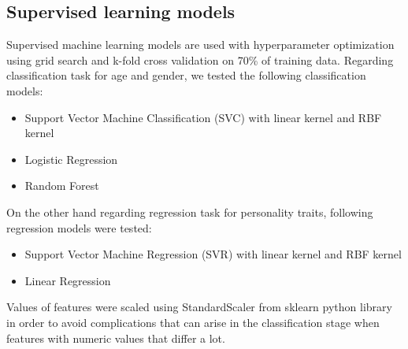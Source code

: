 \documentclass[10pt, a4paper]{article}
\begin{document}
\subsection{Supervised learning models}

Supervised machine learning models are used with hyperparameter optimization using grid search and k-fold cross validation on  70\% of training data. Regarding classification task for age and gender, we tested the following classification models: 
\begin{itemize}[noitemsep,nolistsep] 
	\vspace{2mm}
	\item Support Vector Machine Classification (SVC) with linear kernel and RBF kernel
	\vspace{1mm}
	\item Logistic Regression
	\vspace{1mm}
	\item Random Forest
\end{itemize}
\par\vspace{2mm}
On the other hand regarding regression task for personality traits, following regression models were tested:  
\begin{itemize}[noitemsep,nolistsep]
\vspace{2mm}
	\item Support Vector Machine Regression (SVR) with linear kernel and RBF kernel
	\vspace{1mm}
	\item Linear Regression
	\vspace{1mm}
\end{itemize}
\par\vspace{2mm}
Values of features were scaled using StandardScaler from sklearn python library in order to avoid complications that can arise in the classification stage when features with numeric values that differ a lot.

\vspace{2mm}
\end{document}
